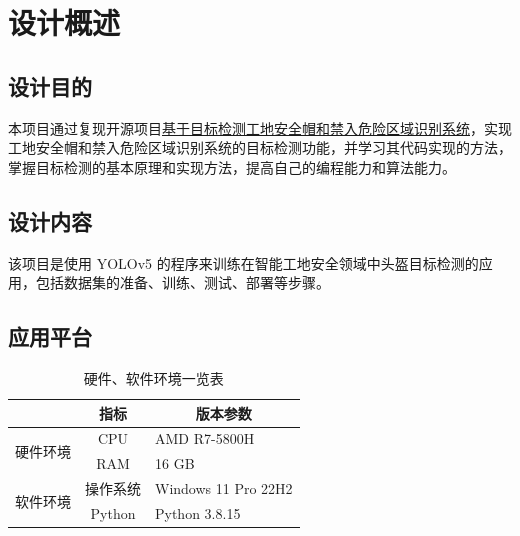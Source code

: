 \documentclass[UTF8,AutoFakeBold,AutoFakeSlant,zihao=-4]{ctexart}
\begin{document}



\newpage
\tableofcontents


\pagestyle{fancy}
\setcounter{page}{1}
\fancyhf{}
\fancyhead[R]{\fontsize{10.5pt}{10.5pt}\selectfont{西北工业大学课程设计（大作业）报告}}
\fancyfoot[R]{\fontsize{9pt}{9pt}\selectfont{\thepage}}
\renewcommand{\headrulewidth}{1pt}
\renewcommand{\footrulewidth}{0pt}

\setlength{\parskip}{0em}
\renewcommand{\baselinestretch}{1.53}
\setlength{\parindent}{1.02cm}

\section{设计概述}
\subsection{设计目的}
本项目通过复现开源项目\href{https://github.com/PeterH0323/Smart_Construction}{基于目标检测工地安全帽和禁入危险区域识别系统}，实现工地安全帽和禁入危险区域识别系统的目标检测功能，并学习其代码实现的方法，掌握目标检测的基本原理和实现方法，提高自己的编程能力和算法能力。

\subsection{设计内容}
该项目是使用 YOLOv5 的程序来训练在智能工地安全领域中头盔目标检测的应用，包括数据集的准备、训练、测试、部署等步骤。

\subsection{应用平台}
\begin{table}[H]
  \centering
  \caption{硬件、软件环境一览表}
  \label{tab:soft-hardware}
  \begin{tabular}{@{}lcl@{}}
    \toprule
                              & 指标     & \multicolumn{1}{c}{版本参数} \\ \midrule
    \multirow{2}{*}{硬件环境} & CPU      & AMD R7-5800H               \\ \cmidrule(l){2-3}
                              & RAM      & 16 GB                         \\ \midrule
    \multirow{2}{*}{软件环境} & 操作系统 & Windows 11 Pro 22H2 \\ \cmidrule(l){2-3}
                              & Python   & Python 3.8.15                 \\ \bottomrule
  \end{tabular}
\end{table}
\end{document}
